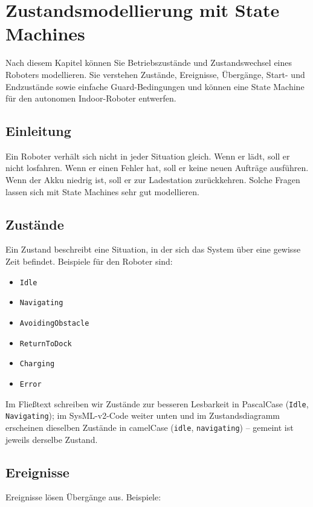 \chapter{Zustandsmodellierung mit State Machines}

\begin{lernziele}
Nach diesem Kapitel können Sie Betriebszustände und Zustandswechsel eines Roboters modellieren. Sie verstehen Zustände, Ereignisse, Übergänge, Start- und Endzustände sowie einfache Guard-Bedingungen und können eine State Machine für den autonomen Indoor-Roboter entwerfen.
\end{lernziele}

\section{Einleitung}
Ein Roboter verhält sich nicht in jeder Situation gleich. Wenn er lädt, soll er nicht losfahren. Wenn er einen Fehler hat, soll er keine neuen Aufträge ausführen. Wenn der Akku niedrig ist, soll er zur Ladestation zurückkehren. Solche Fragen lassen sich mit State Machines sehr gut modellieren.

\section{Zustände}
Ein Zustand beschreibt eine Situation, in der sich das System über eine gewisse Zeit befindet. Beispiele für den Roboter sind:

\begin{itemize}
    \item \texttt{Idle}
    \item \texttt{Navigating}
    \item \texttt{AvoidingObstacle}
    \item \texttt{ReturnToDock}
    \item \texttt{Charging}
    \item \texttt{Error}
\end{itemize}

Im Fließtext schreiben wir Zustände zur besseren Lesbarkeit in PascalCase (\texttt{Idle}, \texttt{Navigating}); im SysML-v2-Code weiter unten und im Zustandsdiagramm erscheinen dieselben Zustände in camelCase (\texttt{idle}, \texttt{navigating}) – gemeint ist jeweils derselbe Zustand.

\section{Ereignisse}
Ereignisse lösen Übergänge aus. Beispiele:

